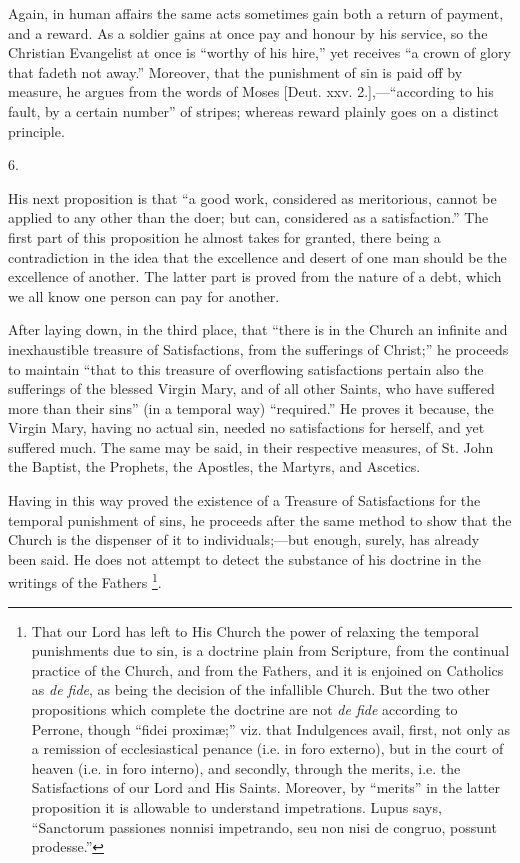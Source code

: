 Again, in human affairs the same acts sometimes gain both a return
of payment, and a reward. As a soldier gains at once pay and honour by
his service, so the Christian Evangelist at once is ``worthy of
his hire,'' yet receives ``a crown of glory that fadeth not
away.'' Moreover, that the punishment of sin is paid off by
measure, he argues from the words of Moses [Deut. xxv. 2.],—``according
to his fault, by a certain number'' of stripes; whereas reward
plainly goes on a distinct principle.

6.

His next proposition is that ``a good work, considered as
meritorious, cannot be applied to any other than the doer; but can,
considered as a satisfaction.'' The first part of this proposition
he almost takes for granted, there being a contradiction in the idea
that the excellence and desert of one man should be the excellence of
another. The latter part is proved from the nature of a debt, which we
all know one person can pay for another.

After laying down, in the third place, that ``there is in the
Church an infinite and inexhaustible treasure of Satisfactions, from
the sufferings of Christ;'' he proceeds to maintain ``that to
this treasure of overflowing satisfactions pertain also the sufferings
of the blessed Virgin Mary, and of all other Saints, who have suffered
more than their sins'' (in a temporal way) ``required.''
He proves it because, the Virgin Mary, having no actual sin, needed no
satisfactions for herself, and yet suffered much. The same may
be said, in their respective measures, of St. John the Baptist, the
Prophets, the Apostles, the Martyrs, and Ascetics.

Having in this way proved the existence of a Treasure of
Satisfactions for the temporal punishment of sins, he proceeds after
the same method to show that the Church is the dispenser of it to
individuals;—but enough, surely, has already been said. He does not
attempt to detect the substance of his doctrine in the writings of the
Fathers \footnote{That our Lord has left to His Church the
power of relaxing the temporal punishments due to sin, is a doctrine
plain from Scripture, from the continual practice of the Church, and
from the Fathers, and it is enjoined on Catholics as \emph{de fide},
as being the decision of the infallible Church. But the two other
propositions which complete the doctrine are not \emph{de fide}
according to Perrone, though ``fidei proximæ;'' viz. that
Indulgences avail, first, not only as a remission of ecclesiastical
penance (i.e. in foro externo), but in the court of heaven (i.e. in
foro interno), and secondly, through the merits, i.e. the
Satisfactions of our Lord and His Saints. Moreover, by
``merits'' in the latter proposition it is allowable to
understand impetrations. Lupus says, ``Sanctorum passiones nonnisi
impetrando, seu non nisi de congruo, possunt prodesse.''}.

